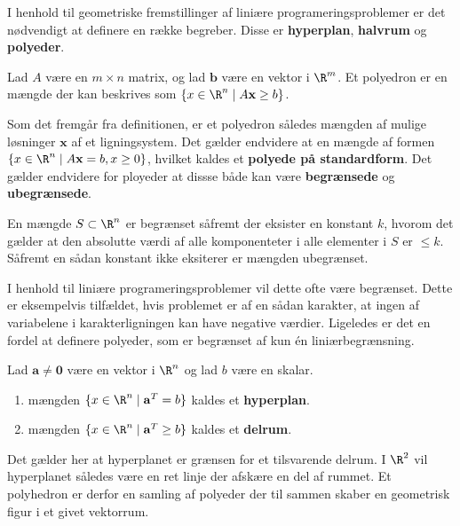 I henhold til geometriske fremstillinger af liniære programeringsproblemer er det nødvendigt at definere en række begreber.
Disse er \textbf{hyperplan}, \textbf{halvrum} og \textbf{polyeder}.

\begin{defn}{}{}
Lad $A$ være en $m \times n$ matrix, og lad $\mathbf{b}$ være en vektor i  $\R^m$.
Et polyedron er en mængde der kan beskrives som $\{x\in \R^n \mid A\mathbf{x}\geq b\}$.
\end{defn}

Som det fremgår fra definitionen, er et polyedron således mængden af mulige løsninger $\mathbf{x}$ af et ligningsystem.
Det gælder endvidere at en mængde af formen $ \{x \in \R^n \mid A\textbf{x}=b,x \geq 0 \}$, hvilket kaldes et \textbf{polyede på standardform}. 
Det gælder endvidere for ployeder at dissse både kan være \textbf{begrænsede} og \textbf{ubegrænsede}.
\begin{defn}{}{}
En mængde $S \subset \R^n$ er begrænset såfremt der eksister en konstant $k$, hvorom det gælder at den absolutte værdi af alle komponenteter i alle elementer i $S$ er $\leq k$. 
Såfremt en sådan konstant ikke eksiterer er mængden ubegrænset. 
\end{defn}
I henhold til liniære programeringsproblemer vil dette ofte være begrænset.
Dette er eksempelvis tilfældet, hvis problemet er af en sådan karakter, at ingen af variabelene i karakterligningen kan have negative værdier.
Ligeledes er det en fordel at definere polyeder, som er begrænset af kun én liniærbegrænsning. 
\begin{defn}{}{}
Lad $\mathbf{a} \neq \mathbf{0}$ være en vektor i $\R^n$ og lad $b$ være en skalar.
\begin{enumerate}[label=(\alph*)]
\item mængden $\{x \in \R^n \mid \mathbf{a}^T=b\}$ kaldes et \textbf{hyperplan}.
\item mængden $\{x \in \R^n \mid \mathbf{a}^T \geq b\}$ kaldes et \textbf{delrum}.
\end{enumerate}
\end{defn}
Det gælder her at hyperplanet er grænsen for et tilsvarende delrum.
I $\R^2$ vil hyperplanet således være en ret linje der afskære en del af rummet.
Et polyhedron er derfor en samling af polyeder der til sammen skaber en geometrisk figur i et givet vektorrum.
